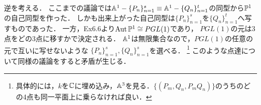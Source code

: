 \documentclass[a4paper]{jsarticle}
\newcommand{\Aut}{\operatorname{Aut}}
\begin{document}
    逆を考える．
    ここまでの議論では$\mathbb{A}^1 - \{P_n\}_{n=1}^{s} \equiv \mathbb{A}^1 - \{Q_n\}_{n=1}^{t}$の同型から$\mathbb{P}^1$の自己同型を作った．
    しかも出来上がった自己同型は$\{P_n\}_{n=1}^{s}$を$\{Q_n\}_{n=1}^{t}$へ写すものであった．
    一方，Ex6.6より$\Aut \proj^1 \cong PGL(1)$であり，
    $PGL(1)$の元は3点をどの3点に移すかで決定される．
    $\mathbb{A}^1$は無限集合なので，$PGL(1)$の任意の元で互いに写せないような
    $\{P_n\}_{n=1}^{s}, \{Q_n\}_{n=1}^{s}$を選べる．
    \footnote{具体的には，$k$を$\mathbb{C}$に埋め込み，$\mathbb{A}^3$を見る．$\{(P_m, Q_n, P_mQ_n)\}$のうちのどの4点も同一平面上に乗らなければ良い．}
    このような点達について同様の議論をすると矛盾が生じる．
\end{document}
